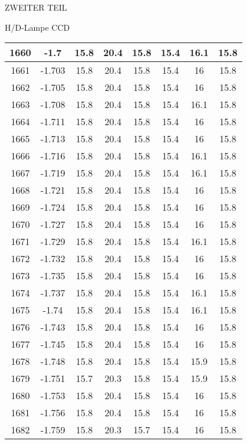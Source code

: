 \begin{appendix}
\begin{chapter}{ZWEITER TEIL}
\begin{section}{H/D-Lampe CCD}
\begin{scriptsize}
\begin{longtable}[htbp]{|c|c|c|c|c|c|c|c|}
            1660 & -1.7 & 15.8 & 20.4 & 15.8 & 15.4 & 16.1 & 15.8 \\ \hline
            1661 & -1.703 & 15.8 & 20.4 & 15.8 & 15.4 & 16 & 15.8 \\ \hline
            1662 & -1.705 & 15.8 & 20.4 & 15.8 & 15.4 & 16 & 15.8 \\ \hline
            1663 & -1.708 & 15.8 & 20.4 & 15.8 & 15.4 & 16.1 & 15.8 \\ \hline
            1664 & -1.711 & 15.8 & 20.4 & 15.8 & 15.4 & 16 & 15.8 \\ \hline
            1665 & -1.713 & 15.8 & 20.4 & 15.8 & 15.4 & 16 & 15.8 \\ \hline
            1666 & -1.716 & 15.8 & 20.4 & 15.8 & 15.4 & 16.1 & 15.8 \\ \hline
            1667 & -1.719 & 15.8 & 20.4 & 15.8 & 15.4 & 16.1 & 15.8 \\ \hline
            1668 & -1.721 & 15.8 & 20.4 & 15.8 & 15.4 & 16 & 15.8 \\ \hline
            1669 & -1.724 & 15.8 & 20.4 & 15.8 & 15.4 & 16 & 15.8 \\ \hline
            1670 & -1.727 & 15.8 & 20.4 & 15.8 & 15.4 & 16 & 15.8 \\ \hline
            1671 & -1.729 & 15.8 & 20.4 & 15.8 & 15.4 & 16.1 & 15.8 \\ \hline
            1672 & -1.732 & 15.8 & 20.4 & 15.8 & 15.4 & 16 & 15.8 \\ \hline
            1673 & -1.735 & 15.8 & 20.4 & 15.8 & 15.4 & 16 & 15.8 \\ \hline
            1674 & -1.737 & 15.8 & 20.4 & 15.8 & 15.4 & 16.1 & 15.8 \\ \hline
            1675 & -1.74 & 15.8 & 20.4 & 15.8 & 15.4 & 16.1 & 15.8 \\ \hline
            1676 & -1.743 & 15.8 & 20.4 & 15.8 & 15.4 & 16 & 15.8 \\ \hline
            1677 & -1.745 & 15.8 & 20.4 & 15.8 & 15.4 & 16 & 15.8 \\ \hline
            1678 & -1.748 & 15.8 & 20.4 & 15.8 & 15.4 & 15.9 & 15.8 \\ \hline
            1679 & -1.751 & 15.7 & 20.3 & 15.8 & 15.4 & 15.9 & 15.8 \\ \hline
            1680 & -1.753 & 15.8 & 20.4 & 15.8 & 15.4 & 16 & 15.8 \\ \hline
            1681 & -1.756 & 15.8 & 20.4 & 15.8 & 15.4 & 16 & 15.8 \\ \hline
            1682 & -1.759 & 15.8 & 20.3 & 15.7 & 15.4 & 16 & 15.8 \\ \hline

\end{longtable}
\end{scriptsize}
\end{section}
\end{chapter}
\end{appendix}
